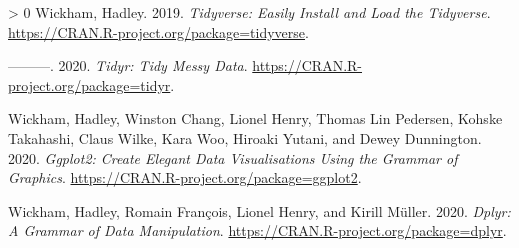 \documentclass[fleqn,10pt,lineno]{wlpeerj} %
\newlength{\cslhangindent}
\newenvironment{CSLReferences}[3] %
 {%
  \setlength{\parindent}{0pt}
  \ifodd #1 \everypar{\setlength{\hangindent}{\cslhangindent}}\ignorespaces\fi
  \ifnum #2 > 0
  \setlength{\parskip}{#2\baselineskip}
  \fi
 }%
 {}
\begin{document}
\begin{CSLReferences}{1}{0}
\leavevmode\hypertarget{ref-R-tidyverse}{}%
Wickham, Hadley. 2019. \emph{Tidyverse: Easily Install and Load the Tidyverse}. \url{https://CRAN.R-project.org/package=tidyverse}.

\leavevmode\hypertarget{ref-R-tidyr}{}%
---------. 2020. \emph{Tidyr: Tidy Messy Data}. \url{https://CRAN.R-project.org/package=tidyr}.

\leavevmode\hypertarget{ref-R-ggplot2}{}%
Wickham, Hadley, Winston Chang, Lionel Henry, Thomas Lin Pedersen, Kohske Takahashi, Claus Wilke, Kara Woo, Hiroaki Yutani, and Dewey Dunnington. 2020. \emph{Ggplot2: Create Elegant Data Visualisations Using the Grammar of Graphics}. \url{https://CRAN.R-project.org/package=ggplot2}.

\leavevmode\hypertarget{ref-R-dplyr}{}%
Wickham, Hadley, Romain François, Lionel Henry, and Kirill Müller. 2020. \emph{Dplyr: A Grammar of Data Manipulation}. \url{https://CRAN.R-project.org/package=dplyr}.

\end{CSLReferences}
\end{document}
